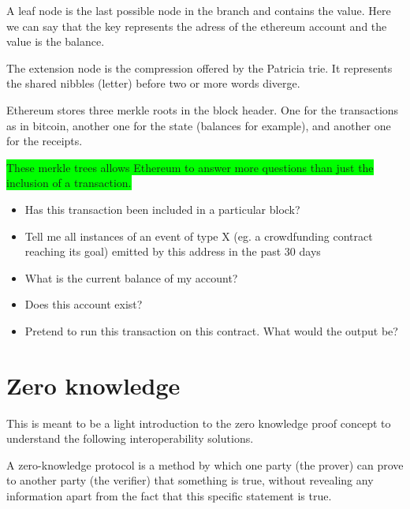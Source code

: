 A leaf node is the last possible node in the branch and contains the value. Here we can say that the key represents the adress of the ethereum account and the value is the balance. 

The extension node is the compression offered by the Patricia trie. It represents the shared nibbles (letter) before two or more words diverge. 



Ethereum\cite{Buterin..13} stores three merkle roots in the block header. One for the transactions as in bitcoin, another one for the state (balances for example), and another one for the receipts. 

\colorbox{lime}{
These merkle trees allows Ethereum to answer more questions than just the inclusion of a transaction.
}
\begin{itemize}
\item Has this transaction been included in a particular block?
\item Tell me all instances of an event of type X (eg. a crowdfunding contract reaching its goal) emitted by this address in the past 30 days
\item What is the current balance of my account?
\item Does this account exist?
\item Pretend to run this transaction on this contract. What would the output be?
\end{itemize}


\section{Zero knowledge}
\label{zeroknowledge}
This is meant to be a light introduction to the zero knowledge proof concept to understand the following interoperability solutions. 

A zero-knowledge protocol is a method by which one party (the prover) can prove to another party (the verifier) that something is true, without revealing any information apart from the fact that this specific statement is true. \cite{Goldwasser}

